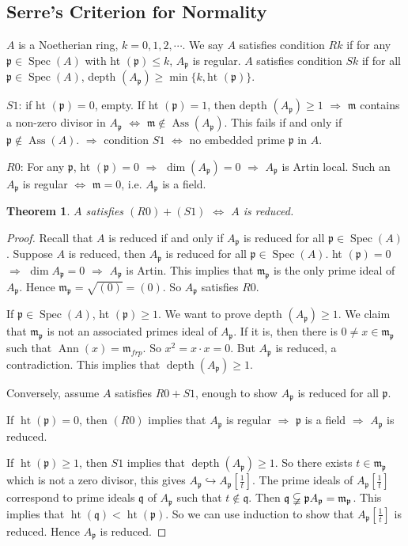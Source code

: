 \documentclass[cs4size]{article}
\newcommand{\frm}{\mathfrak{m}}
\newcommand{\frp}{\mathfrak{p}}
\newcommand{\frq}{\mathfrak{q}}
\DeclareMathOperator{\Ann}{Ann}
\DeclareMathOperator{\Spec}{Spec}
\DeclareMathOperator{\Ass}{Ass}
\DeclareMathOperator{\height}{ht}
\DeclareMathOperator{\depth}{depth}
\newtheorem{thm}{Theorem}
\begin{document}



\subsection{Serre's Criterion for Normality}
$A$ is a Noetherian ring, $k=0,1,2,\cdots$. We say $A$ satisfies condition $Rk$ if for any $\frp\in\Spec(A)$ with ht $(\frp)\leq k$, $A_\frp$ is regular.
$A$ satisfies condition $Sk$ if for all $\frp\in \Spec(A)$, depth $(A_\frp)\geq \min\{k,\text{ht }(\frp)\}$.

$S1$: if ht $(\frp)=0$, empty. If ht $(\frp)=1$, then depth $(A_\frp)\geq 1$ $\Rightarrow$ $\frm$ contains a non-zero divisor in $A_\frp$ $\Leftrightarrow$ $\frm\notin \Ass(A_\frp)$. This fails if and only if $\frp\notin \Ass(A)$. $\Rightarrow$ condition $S1$ $\Leftrightarrow$ no embedded prime $\frp$ in $A$.

$R0$: For any $\frp$, ht $(\frp)=0$ $\Rightarrow$ $\dim (A_\frp)=0$ $\Rightarrow$ $A_\frp$ is Artin local. Such an $A_\frp$ is regular $\Leftrightarrow$ $\frm=0$, i.e. $A_\frp$ is a field.

\begin{thm}
$A$ satisfies $(R0)+(S1)$ $\Leftrightarrow$ $A$ is reduced.
\end{thm}
\begin{proof}
Recall that $A$ is reduced if and only if $A_\frp$ is reduced for all $\frp\in\Spec(A)$. Suppose $A$ is reduced, then $A_\frp$ is reduced for all $\frp\in\Spec(A)$. ht $(\frp)=0$ $\Rightarrow$ $\dim A_\frp=0$ $\Rightarrow$ $A_\frp$ is Artin. This implies that $\frm_\frp$ is the only prime ideal of $A_\frp$. Hence $\frm_\frp=\sqrt{(0)}=(0)$. So $A_\frp$ satisfies $R0$.

If $\frp\in\Spec (A)$, ht $(\frp)\geq 1$. We want to prove depth $(A_\frp)\geq 1$. We claim that $\frm_\frp$ is not an associated primes ideal of $A_\frp$. If it is, then there is $0\neq x\in\frm_\frp$ such that $\Ann(x)=\frm_{frp}$. So $x^2=x\cdot x=0$. But $A_\frp$ is reduced, a contradiction. This implies that $\depth (A_\frp)\geq 1$.

Conversely, assume $A$ satisfies $R0+S1$, enough to show $A_\frp$ is reduced for all $\frp$.

If $\height (\frp)=0$, then $(R0)$ implies that $A_\frp$ is regular $\Rightarrow$ $\frp$ is a field $\Rightarrow$ $A_\frp$ is reduced.

If $\height(\frp)\geq 1$, then $S1$ implies that $\depth(A_\frp)\geq 1$. So there exists $t\in \frm_\frp$ which is not a zero divisor, this gives $A_\frp\hookrightarrow A_\frp[\frac{1}{t}]$. The prime ideals of $A_\frp[\frac{1}{t}]$ correspond to prime ideals $\frq$ of $A_\frp$ such that $t\notin \frq$. Then $\frq \varsubsetneqq\frp A_\frp=\frm_\frp$. This implies that $\height(\frq)<\height(\frp)$. So we can use induction to show that $A_\frp[\frac{1}{t}]$ is reduced. Hence $A_\frp$ is reduced.
\end{proof}
\end{document}
